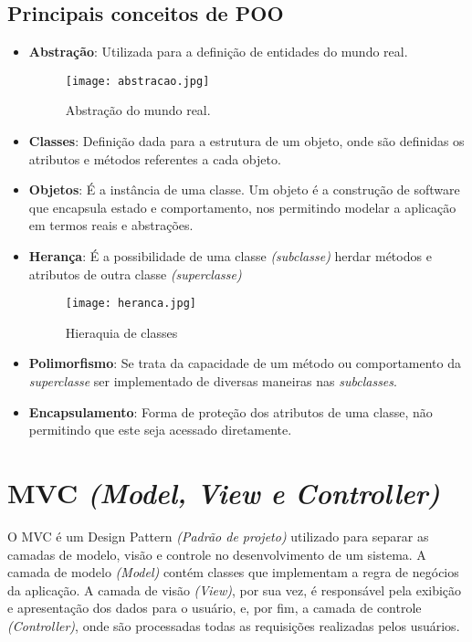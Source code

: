        \subsection{Principais conceitos de POO\label{sub:principais-conceitos}}
            \begin{itemize}
                \item \textbf{Abstração}: Utilizada para a definição de entidades do mundo real.
                        \begin{figure}[!htb]
                            \centering
                            \texttt{[image: abstracao.jpg]}
                            \caption{\small Abstração do mundo real.}
                            \label{cap:conceitos}
                        \end{figure}
                \item \textbf{Classes}: Definição dada para a estrutura de um objeto, onde são definidas os atributos e métodos referentes a cada objeto.

                \item \textbf{Objetos}: É a instância de uma classe. Um objeto é a construção de software que encapsula estado e comportamento, nos permitindo modelar a aplicação em termos reais e abstrações.

                \item \textbf{Herança}: É a possibilidade de uma classe \emph{(subclasse)} herdar métodos e atributos de outra classe \emph{(superclasse)}
                        \begin{figure}[!htb]
                            \centering
                            \texttt{[image: heranca.jpg]}
                            \caption{\small Hieraquia de classes}
                            \label{cap:heranca}
                        \end{figure}
                \item \textbf{Polimorfismo}: Se trata da capacidade de um método ou comportamento da \emph{superclasse} ser implementado de diversas maneiras nas \emph{subclasses}.
                \item \textbf{Encapsulamento}: Forma de proteção dos atributos de uma classe, não permitindo que este seja acessado diretamente.

            \end{itemize}


    \section{MVC \emph{(Model, View e Controller)} \label{sec:mvc}}
        O MVC é um Design Pattern \emph{(Padrão de projeto)} utilizado para separar as camadas de modelo, visão e controle no desenvolvimento de um sistema. A camada de modelo \emph{(Model)} contém classes que implementam a regra de negócios da aplicação. A camada de visão \emph{(View)}, por sua vez, é responsável pela exibição e apresentação dos dados para o usuário, e, por fim, a camada de controle \emph{(Controller)}, onde são processadas todas as requisições realizadas pelos usuários.

